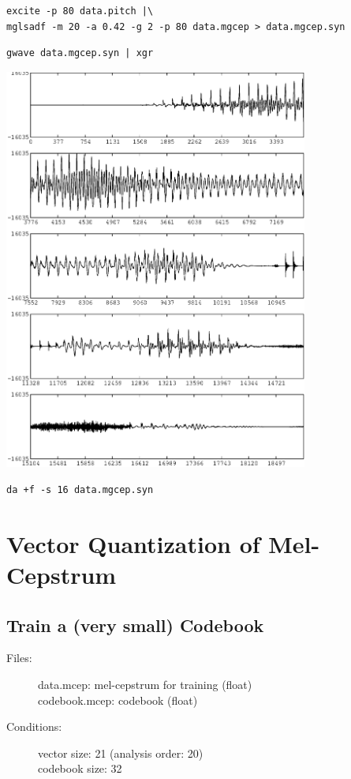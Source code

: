 \documentclass[a4paper]{article}
\begin{document}
\begin{verbatim}
excite -p 80 data.pitch |\
mglsadf -m 20 -a 0.42 -g 2 -p 80 data.mgcep > data.mgcep.syn
\end{verbatim}

\begin{verbatim}
gwave data.mgcep.syn | xgr
\end{verbatim}

\includegraphics[width=10cm]{data.mgcep.syn.gwave.eps}

\begin{verbatim}
da +f -s 16 data.mgcep.syn
\end{verbatim}

\section{Vector Quantization of Mel-Cepstrum}

\subsection{Train a (very small) Codebook}
\begin{description}
\item[Files:]
   data.mcep: mel-cepstrum for training (float) \\
   codebook.mcep: codebook (float)
\item[Conditions:]
   vector size: 21 (analysis order: 20)\\
   codebook size: 32
\end{description}
\end{document}
